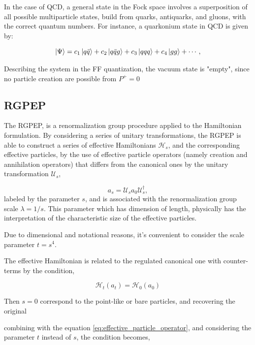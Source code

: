 \documentclass[11pt,a4paper,twoside,pdf]{article}
\numberwithin{equation}{section}
\begin{document}
In the case of QCD, a general state in the Fock space involves a superposition of all 
possible multiparticle states, build from quarks, antiquarks, and gluons, with the
correct quantum numbers. For instance, a quarkonium state in QCD is given by:

\begin{equation}
    \ket{\Psi} = c_1 \ket{q\bar{q}} + c_2 \ket{q\bar{q}g} + c_3 \ket{qqq} 
    + c_4 \ket{gg} + \cdots,
\end{equation}

Describing the system in the FF quantization, the vacuum state is "empty", since 
no particle creation are possible from $P^+ = 0$


\subsection{RGPEP}
The RGPEP, is a renormalization group procedure applied to the Hamiltonian 
formulation. By considering a series of unitary transformations, the RGPEP is able to construct a 
series of effective Hamiltonians $\mathcal{H}_s$, and the corresponding effective 
particles, by the use of effective particle operators (namely creation and 
annihilation operators) that differs from the canonical ones by the unitary 
transformation $\mathcal{U}_s$,

\begin{equation}
    a_s = \mathcal{U}_sa_0\mathcal{U}_s^\dagger,
    \label{eq:effective_particle_operator}
\end{equation}
labeled by the parameter $s$, and is associated with the renormalization group scale
$\lambda = 1/s$. This parameter which has dimension of length, physically has the 
interpretation of the characteristic size of the effective particles.

Due to dimensional and notational reasons, it's convenient to consider the scale 
parameter $t = s^4$.

The effective Hamiltonian is related to the regulated canonical one with counter-terms 
by the condition,

\begin{equation}
    \mathcal{H}_t(a_t) = \mathcal{H}_0(a_0)
\end{equation}

Then $s=0$ correspond to the point-like or bare particles, and recovering the original

combining with the equation \eqref{eq:effective_particle_operator}, and considering 
the parameter $t$ instead of $s$, the condition becomes,
\end{document}
